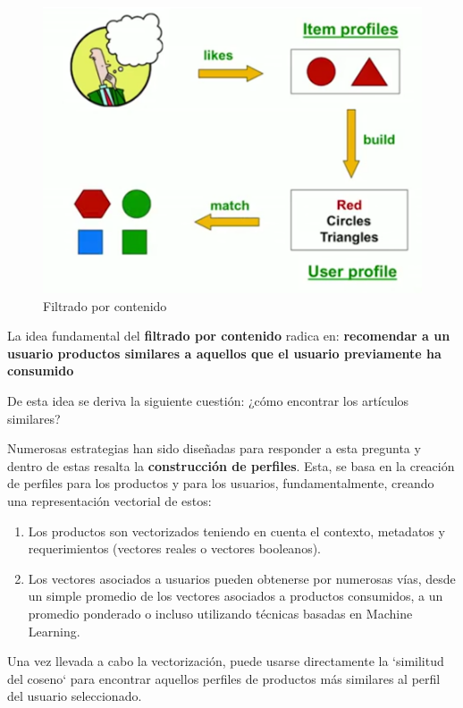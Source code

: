 \documentclass[14pt]{extarticle}
\begin{document}
\begin{figure}[H]
    \centering
    \includegraphics[width=\textwidth]{./images/content-bases_filtering.png}
    \caption{Filtrado por contenido}
    \label{Filtrado por contenido}
\end{figure}


La idea fundamental del \textbf{filtrado por contenido} radica en: \textbf{recomendar a un usuario productos similares a aquellos que el usuario previamente ha consumido}

De esta idea se deriva la siguiente cuestión: ¿cómo encontrar los artículos similares?

Numerosas estrategias han sido diseñadas para responder a esta pregunta y dentro de estas resalta la \textbf{construcción de perfiles}. Esta, se basa en la creación de perfiles para los productos y para los usuarios, fundamentalmente, creando una representación vectorial de estos:

\begin{enumerate}
    \item Los productos son vectorizados teniendo en cuenta el contexto, metadatos y requerimientos (vectores reales o vectores booleanos).
    \item Los vectores asociados a usuarios pueden obtenerse por numerosas vías, desde un simple promedio de los vectores asociados a productos consumidos, a un promedio ponderado o incluso utilizando técnicas basadas en Machine Learning.
\end{enumerate}

Una vez llevada a cabo la vectorización, puede usarse directamente la `similitud del coseno` para encontrar aquellos perfiles de productos más similares al perfil del usuario seleccionado.
\end{document}
